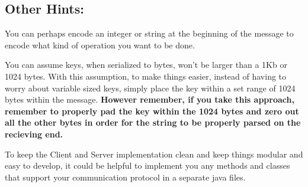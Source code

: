 \documentclass{article}
\begin{document}

\subsection*{Other Hints:}

\begin{info}
You can perhaps encode an integer or string at the beginning of the message to encode what kind of operation you want to be done.
\end{info}

\vspace{-0.4cm}

\begin{info}
You can assume keys, when serialized to bytes, won't be larger than a 1Kb or 1024 bytes. With this assumption, to make things easier, instead of having to worry about variable sized keys, simply place the key within a set range of 1024 bytes within the message. \textbf{However remember, if you take this approach, remember to properly pad the key within the 1024 bytes and zero out all the other bytes in order for the string to be properly parsed on the recieving end.}
\end{info}

\vspace{-0.4cm}

\begin{info}
To keep the Client and Server implementation clean and keep things modular and easy to develop, it could be helpful to implement you any methods and classes that support your communication protocol in a separate java files. 
\end{info}
\end{document}
